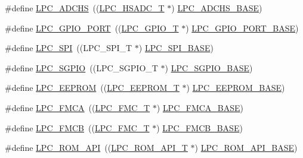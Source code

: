 \begin{DoxyCompactItemize}
\item 
\#define \hyperlink{group___p_e_r_i_p_h__43_x_x___b_a_s_e_ga31f6df8d98b481c3595d9780b86f79c4}{L\+P\+C\+\_\+\+A\+D\+C\+HS}~((\hyperlink{struct_l_p_c___h_s_a_d_c___t}{L\+P\+C\+\_\+\+H\+S\+A\+D\+C\+\_\+T}            $\ast$) \hyperlink{group___p_e_r_i_p_h__43_x_x___b_a_s_e_gabecd591c7e203c132a20798f724c6ed6}{L\+P\+C\+\_\+\+A\+D\+C\+H\+S\+\_\+\+B\+A\+SE})
\item 
\#define \hyperlink{group___p_e_r_i_p_h__43_x_x___b_a_s_e_ga401a76842ea88d6e311bba578f43b259}{L\+P\+C\+\_\+\+G\+P\+I\+O\+\_\+\+P\+O\+RT}~((\hyperlink{struct_l_p_c___g_p_i_o___t}{L\+P\+C\+\_\+\+G\+P\+I\+O\+\_\+T}             $\ast$) \hyperlink{group___p_e_r_i_p_h__43_x_x___b_a_s_e_ga7de0e57c07a6bd4ff8cf9f2b85249ed4}{L\+P\+C\+\_\+\+G\+P\+I\+O\+\_\+\+P\+O\+R\+T\+\_\+\+B\+A\+SE})
\item 
\#define \hyperlink{group___p_e_r_i_p_h__43_x_x___b_a_s_e_ga9b593f008d0061052e90a8865d702ce5}{L\+P\+C\+\_\+\+S\+PI}~((L\+P\+C\+\_\+\+S\+P\+I\+\_\+T              $\ast$) \hyperlink{group___p_e_r_i_p_h__43_x_x___b_a_s_e_gaf611188188574ba805b6de71acc88c6c}{L\+P\+C\+\_\+\+S\+P\+I\+\_\+\+B\+A\+SE})
\item 
\#define \hyperlink{group___p_e_r_i_p_h__43_x_x___b_a_s_e_ga8fd3d7c50a88d0f5f54a83f92eeaf687}{L\+P\+C\+\_\+\+S\+G\+P\+IO}~((L\+P\+C\+\_\+\+S\+G\+P\+I\+O\+\_\+T            $\ast$) \hyperlink{group___p_e_r_i_p_h__43_x_x___b_a_s_e_ga3e50d6c46ad4612cde93035a12b204a8}{L\+P\+C\+\_\+\+S\+G\+P\+I\+O\+\_\+\+B\+A\+SE})
\item 
\#define \hyperlink{group___p_e_r_i_p_h__43_x_x___b_a_s_e_ga3af7cc9a426f661ac4deee8a9997a830}{L\+P\+C\+\_\+\+E\+E\+P\+R\+OM}~((\hyperlink{struct_l_p_c___e_e_p_r_o_m___t}{L\+P\+C\+\_\+\+E\+E\+P\+R\+O\+M\+\_\+T}           $\ast$) \hyperlink{group___p_e_r_i_p_h__43_x_x___b_a_s_e_ga9d1fcaafb9feb0f8253c3cef1edc7e9f}{L\+P\+C\+\_\+\+E\+E\+P\+R\+O\+M\+\_\+\+B\+A\+SE})
\item 
\#define \hyperlink{group___p_e_r_i_p_h__43_x_x___b_a_s_e_ga3337d6fd79512d56b2c2362cb48b0ff5}{L\+P\+C\+\_\+\+F\+M\+CA}~((\hyperlink{struct_l_p_c___f_m_c___t}{L\+P\+C\+\_\+\+F\+M\+C\+\_\+T}              $\ast$) \hyperlink{group___p_e_r_i_p_h__43_x_x___b_a_s_e_gaf59ae457b89f9991f1528a5625234445}{L\+P\+C\+\_\+\+F\+M\+C\+A\+\_\+\+B\+A\+SE})
\item 
\#define \hyperlink{group___p_e_r_i_p_h__43_x_x___b_a_s_e_ga13ff7e03af04887218e740c984f0af3e}{L\+P\+C\+\_\+\+F\+M\+CB}~((\hyperlink{struct_l_p_c___f_m_c___t}{L\+P\+C\+\_\+\+F\+M\+C\+\_\+T}              $\ast$) \hyperlink{group___p_e_r_i_p_h__43_x_x___b_a_s_e_ga9c9492ce5a1b5e99d6500db256f020c6}{L\+P\+C\+\_\+\+F\+M\+C\+B\+\_\+\+B\+A\+SE})
\item 
\#define \hyperlink{group___p_e_r_i_p_h__43_x_x___b_a_s_e_ga93f07fc38c09c20a7141e175ce599ef7}{L\+P\+C\+\_\+\+R\+O\+M\+\_\+\+A\+PI}~((\hyperlink{struct_l_p_c___r_o_m___a_p_i___t}{L\+P\+C\+\_\+\+R\+O\+M\+\_\+\+A\+P\+I\+\_\+T}          $\ast$) \hyperlink{group___p_e_r_i_p_h__43_x_x___b_a_s_e_ga2ae00d891b7603694f3a1eb640013f63}{L\+P\+C\+\_\+\+R\+O\+M\+\_\+\+A\+P\+I\+\_\+\+B\+A\+SE})
\end{DoxyCompactItemize}


